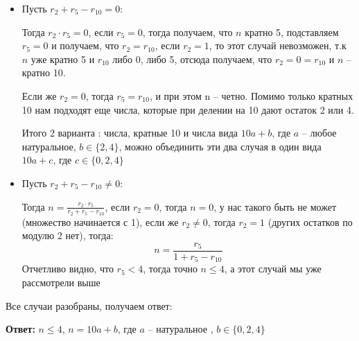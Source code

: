 \documentclass[a4paper,12pt]{article}
\begin{document}
\begin{itemize}
\item Пусть $r_2 + r_5 - r_{10} = 0$:

Тогда $r_2 \cdot r_5 = 0$, если $r_5 = 0$, тогда получаем, что $n$ кратно 5, подставляем $r_5 = 0$ и получаем, что $r_2 = r_{10}$, если $r_2 = 1$, то этот случай невозможен, т.к $n$ уже кратно 5 и $r_{10}$  либо 0, либо 5, отсюда получаем, что $r_2 = 0 = r_{10}$ и $n$ -- кратно 10. 

Если же $r_2 = 0$, тогда $r_5 = r_{10}$, и при этом n -- четно. Помимо только кратных 10 нам подходят еще числа, которые при делении на 10 дают остаток 2 или 4.


Итого 2 варианта : числа, кратные 10 и числа вида $10a + b$, где $a$ -- любое натуральное, $b \in \{2, 4\}$, можно объединить эти два случая в один вида $10a + c$, где $c \in \{0, 2, 4\}$
\item Пусть $r_2 + r_5 - r_{10} \neq 0$:

Тогда $n = \frac{r_2 \cdot r_5}{r_2 + r_5 - r_{10}}$, если $r_2 = 0$, тогда $n = 0$, у нас такого быть не может (множество начинается с 1), если же $r_2 \neq 0$, тогда $r_2 = 1$ (других остатков по модулю 2 нет), тогда:
\[
n = \frac{r_5}{1 + r_5 - r_{10}}
\]
Отчетливо видно, что $r_5 < 4$, тогда  точно $n \leq 4$, а этот случай мы уже рассмотрели выше
\end{itemize}
\begin{center}
Все случаи разобраны, получаем ответ:
\end{center}
\begin{center}
\textbf{Ответ: } $n \leq 4$,  $n = 10a + b$, где $a$ -- натуральное , $b \in \{0, 2, 4\}$
\end{center}
\end{document}
